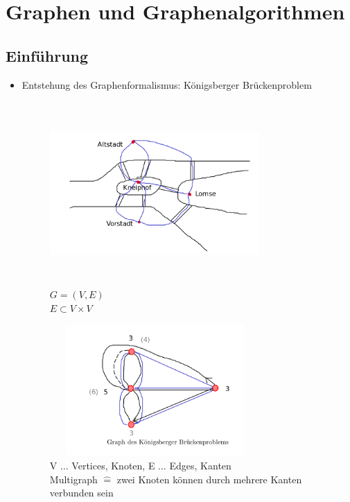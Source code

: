 
\chapter{Graphen und Graphenalgorithmen}
\section{Einführung}

\begin{itemize}
    \item Entstehung des Graphenformalismus: Königsberger Brückenproblem

    \begin{figure}[htbp]
        \begin{minipage}[t]{8cm}
            \centering
            \vspace{0cm}
            \includegraphics[width=8cm,height=7cm,keepaspectratio]{./Pictures/Koenigsberg.png}\\
            $G = (V, E)$\\
            $E \subset V \times V$
        \end{minipage}
        \begin{minipage}[t]{8cm}
            \vspace{0cm}
            \includegraphics[width=8cm,height=5cm,keepaspectratio]{./Pictures/Brueckengraph.png}\\
            V $\dots$ Vertices, Knoten, E $\dots$ Edges, Kanten\\
            Multigraph $\widehat{=}$ zwei Knoten können durch mehrere Kanten verbunden sein
        \end{minipage}
    \end{figure}


\end{itemize}
